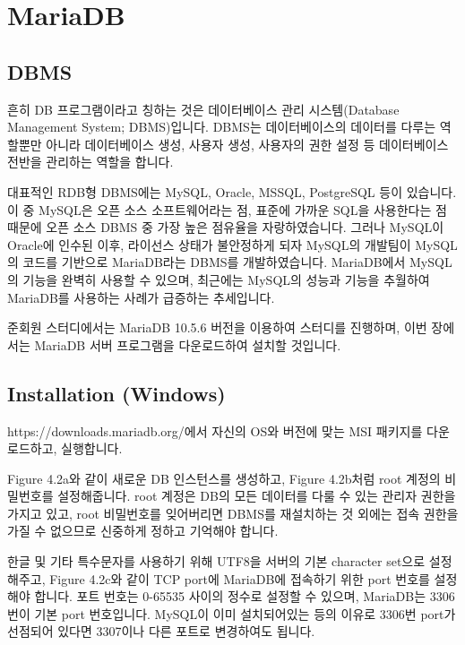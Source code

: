 \section{MariaDB}\label{sect:maria-db}

\subsection*{DBMS}

흔히 DB 프로그램이라고 칭하는 것은 데이터베이스 관리 시스템(Database Management System; DBMS)입니다. DBMS는 데이터베이스의 데이터를 다루는 역할뿐만 아니라 데이터베이스 생성, 사용자 생성, 사용자의 권한 설정 등 데이터베이스 전반을 관리하는 역할을 합니다.

대표적인 RDB형 DBMS에는 MySQL, Oracle, MSSQL, PostgreSQL 등이 있습니다. 이 중 MySQL은 오픈 소스 소프트웨어라는 점, 표준에 가까운 SQL을 사용한다는 점 때문에 오픈 소스 DBMS 중 가장 높은 점유율을 자랑하였습니다. 그러나 MySQL이 Oracle에 인수된 이후, 라이선스 상태가 불안정하게 되자 MySQL의 개발팀이 MySQL의 코드를 기반으로 MariaDB라는 DBMS를 개발하였습니다. MariaDB에서 MySQL의 기능을 완벽히 사용할 수 있으며, 최근에는 MySQL의 성능과 기능을 추월하여 MariaDB를 사용하는 사례가 급증하는 추세입니다.

준회원 스터디에서는 MariaDB 10.5.6 버전을 이용하여 스터디를 진행하며, 이번 장에서는 MariaDB 서버 프로그램을 다운로드하여 설치할 것입니다.

\subsection*{Installation (Windows)}

https://downloads.mariadb.org/에서 자신의 OS와 버전에 맞는 MSI 패키지를 다운로드하고, 실행합니다.


Figure 4.2a와 같이 새로운 DB 인스턴스를 생성하고, Figure 4.2b처럼 root 계정의 비밀번호를 설정해줍니다. root 계정은 DB의 모든 데이터를 다룰 수 있는 관리자 권한을 가지고 있고, root 비밀번호를 잊어버리면 DBMS를 재설치하는 것 외에는 접속 권한을 가질 수 없으므로 신중하게 정하고 기억해야 합니다.

한글 및 기타 특수문자를 사용하기 위해 UTF8을 서버의 기본 character set으로 설정해주고, Figure 4.2c와 같이 TCP port에 MariaDB에 접속하기 위한 port 번호를 설정해야 합니다. 포트 번호는 0-65535 사이의 정수로 설정할 수 있으며, MariaDB는 3306번이 기본 port 번호입니다. MySQL이 이미 설치되어있는 등의 이유로 3306번 port가 선점되어 있다면 3307이나 다른 포트로 변경하여도 됩니다.

